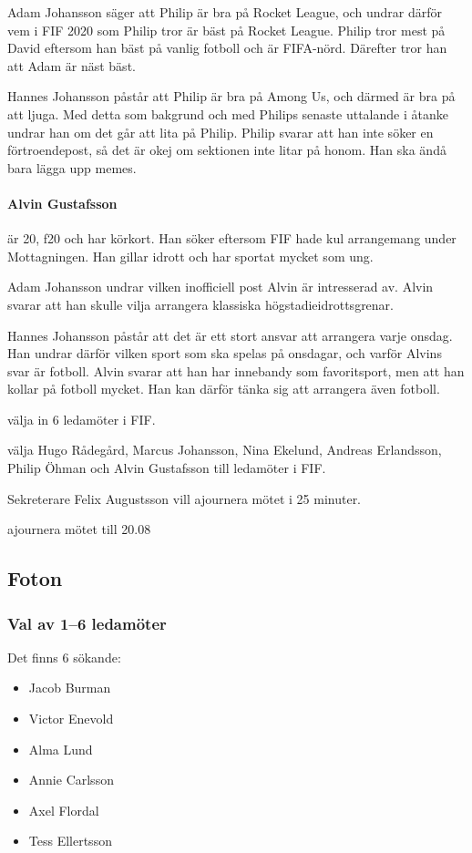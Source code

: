 \documentclass[hidelinks]{sektionsmote}
\begin{document}
Adam Johansson säger att Philip är bra på Rocket League, och undrar därför vem i FIF 2020 som Philip tror är bäst på Rocket League.
Philip tror mest på David eftersom han bäst på vanlig fotboll och är FIFA-nörd.
Därefter tror han att Adam är näst bäst.

Hannes Johansson påstår att Philip är bra på Among Us, och därmed är bra på att ljuga.
Med detta som bakgrund och med Philips senaste uttalande i åtanke undrar han om det går att lita på Philip.
Philip svarar att han inte söker en förtroendepost, så det är okej om sektionen inte litar på honom.
Han ska ändå bara lägga upp memes.

\paragraph{Alvin Gustafsson} är 20, f20 och har körkort.
Han söker eftersom FIF hade kul arrangemang under Mottagningen.
Han gillar idrott och har sportat mycket som ung.

Adam Johansson undrar vilken inofficiell post Alvin är intresserad av.
Alvin svarar att han skulle vilja arrangera klassiska högstadieidrottsgrenar.

Hannes Johansson påstår att det är ett stort ansvar att arrangera varje onsdag.
Han undrar därför vilken sport som ska spelas på onsdagar, och varför Alvins svar är fotboll.
Alvin svarar att han har innebandy som favoritsport, men att han kollar på fotboll mycket.
Han kan därför tänka sig att arrangera även fotboll.

\begin{beslut}
  \item välja in 6 ledamöter i FIF.
  \item välja Hugo Rådegård, Marcus Johansson, Nina Ekelund, Andreas Erlandsson, Philip Öhman och Alvin Gustafsson till ledamöter i FIF.
\end{beslut}

\begin{ofraga}
  Sekreterare Felix Augustsson vill ajournera mötet i 25 minuter.
  \begin{beslut}
    \item ajournera mötet till 20.08
  \end{beslut}
\end{ofraga}


\subsection{Foton}
\subsubsection{Val av 1--6 ledamöter}
Det finns 6 sökande:
\begin{itemize}
    \item Jacob Burman
    \item Victor Enevold
    \item Alma Lund
    \item Annie Carlsson
    \item Axel Flordal
    \item Tess Ellertsson
\end{itemize}
\end{document}
